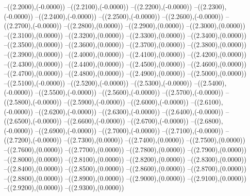 {	--({\sx*(2.2000)},{\sy*(-0.0000)})
	--({\sx*(2.2100)},{\sy*(-0.0000)})
	--({\sx*(2.2200)},{\sy*(-0.0000)})
	--({\sx*(2.2300)},{\sy*(-0.0000)})
	--({\sx*(2.2400)},{\sy*(-0.0000)})
	--({\sx*(2.2500)},{\sy*(-0.0000)})
	--({\sx*(2.2600)},{\sy*(-0.0000)})
	--({\sx*(2.2700)},{\sy*(-0.0000)})
	--({\sx*(2.2800)},{\sy*(0.0000)})
	--({\sx*(2.2900)},{\sy*(0.0000)})
	--({\sx*(2.3000)},{\sy*(0.0000)})
	--({\sx*(2.3100)},{\sy*(0.0000)})
	--({\sx*(2.3200)},{\sy*(0.0000)})
	--({\sx*(2.3300)},{\sy*(0.0000)})
	--({\sx*(2.3400)},{\sy*(0.0000)})
	--({\sx*(2.3500)},{\sy*(0.0000)})
	--({\sx*(2.3600)},{\sy*(0.0000)})
	--({\sx*(2.3700)},{\sy*(0.0000)})
	--({\sx*(2.3800)},{\sy*(0.0000)})
	--({\sx*(2.3900)},{\sy*(0.0000)})
	--({\sx*(2.4000)},{\sy*(0.0000)})
	--({\sx*(2.4100)},{\sy*(0.0000)})
	--({\sx*(2.4200)},{\sy*(0.0000)})
	--({\sx*(2.4300)},{\sy*(0.0000)})
	--({\sx*(2.4400)},{\sy*(0.0000)})
	--({\sx*(2.4500)},{\sy*(0.0000)})
	--({\sx*(2.4600)},{\sy*(0.0000)})
	--({\sx*(2.4700)},{\sy*(0.0000)})
	--({\sx*(2.4800)},{\sy*(0.0000)})
	--({\sx*(2.4900)},{\sy*(0.0000)})
	--({\sx*(2.5000)},{\sy*(0.0000)})
	--({\sx*(2.5100)},{\sy*(-0.0000)})
	--({\sx*(2.5200)},{\sy*(-0.0000)})
	--({\sx*(2.5300)},{\sy*(-0.0000)})
	--({\sx*(2.5400)},{\sy*(-0.0000)})
	--({\sx*(2.5500)},{\sy*(-0.0000)})
	--({\sx*(2.5600)},{\sy*(-0.0000)})
	--({\sx*(2.5700)},{\sy*(-0.0000)})
	--({\sx*(2.5800)},{\sy*(-0.0000)})
	--({\sx*(2.5900)},{\sy*(-0.0000)})
	--({\sx*(2.6000)},{\sy*(-0.0000)})
	--({\sx*(2.6100)},{\sy*(-0.0000)})
	--({\sx*(2.6200)},{\sy*(-0.0000)})
	--({\sx*(2.6300)},{\sy*(-0.0000)})
	--({\sx*(2.6400)},{\sy*(-0.0000)})
	--({\sx*(2.6500)},{\sy*(-0.0000)})
	--({\sx*(2.6600)},{\sy*(-0.0000)})
	--({\sx*(2.6700)},{\sy*(-0.0000)})
	--({\sx*(2.6800)},{\sy*(-0.0000)})
	--({\sx*(2.6900)},{\sy*(-0.0000)})
	--({\sx*(2.7000)},{\sy*(-0.0000)})
	--({\sx*(2.7100)},{\sy*(-0.0000)})
	--({\sx*(2.7200)},{\sy*(-0.0000)})
	--({\sx*(2.7300)},{\sy*(0.0000)})
	--({\sx*(2.7400)},{\sy*(0.0000)})
	--({\sx*(2.7500)},{\sy*(0.0000)})
	--({\sx*(2.7600)},{\sy*(0.0000)})
	--({\sx*(2.7700)},{\sy*(0.0000)})
	--({\sx*(2.7800)},{\sy*(0.0000)})
	--({\sx*(2.7900)},{\sy*(0.0000)})
	--({\sx*(2.8000)},{\sy*(0.0000)})
	--({\sx*(2.8100)},{\sy*(0.0000)})
	--({\sx*(2.8200)},{\sy*(0.0000)})
	--({\sx*(2.8300)},{\sy*(0.0000)})
	--({\sx*(2.8400)},{\sy*(0.0000)})
	--({\sx*(2.8500)},{\sy*(0.0000)})
	--({\sx*(2.8600)},{\sy*(0.0000)})
	--({\sx*(2.8700)},{\sy*(0.0000)})
	--({\sx*(2.8800)},{\sy*(0.0000)})
	--({\sx*(2.8900)},{\sy*(0.0000)})
	--({\sx*(2.9000)},{\sy*(0.0000)})
	--({\sx*(2.9100)},{\sy*(0.0000)})
	--({\sx*(2.9200)},{\sy*(0.0000)})
	--({\sx*(2.9300)},{\sy*(0.0000)})
}
